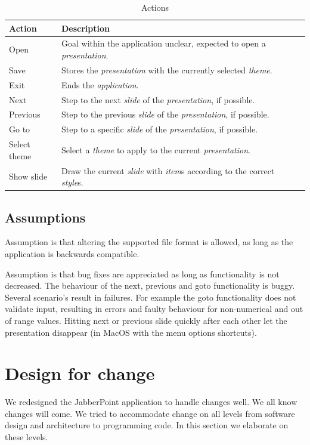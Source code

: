 \documentclass[a4paper]{article}
\begin{document}
\begin{table}[!htpb]
\centering
\begin{tabular}{|l|l|l|l|}
\hline
\textbf{Action} & \textbf{Description}\\
\hline
\hline
Open & Goal within the application unclear, expected to open a \textit{presentation}.\\
\hline
Save & Stores the \textit{presentation} with the currently selected \textit{theme}.\\ 
\hline
Exit & Ends the \textit{application}.\\
\hline
Next & Step to the next \textit{slide} of the \textit{presentation}, if possible.\\
\hline
Previous & Step to the previous \textit{slide} of the \textit{presentation}, if possible.\\
\hline
Go to & Step to a specific \textit{slide} of the \textit{presentation}, if possible.\\
\hline
Select theme & Select a \textit{theme} to apply to the current \textit{presentation}.\\
\hline
Show slide & Draw the current \textit{slide} with \textit{item}s according to the correct \textit{style}s.\\
\hline
\end{tabular}
\caption{Actions}
\label{tab:template}
\end{table}

\subsection{Assumptions}
Assumption is that altering the supported file format is allowed, as long as the application is backwards compatible.

Assumption is that bug fixes are appreciated as long as functionality is not decreased. The behaviour of the next, previous and goto functionality is buggy. Several scenario's result in failures. For example the goto functionality does not validate input, resulting in errors and faulty behaviour for non-numerical and out of range values. Hitting next or previous slide quickly after each other let the presentation disappear (in MacOS with the menu options shortcuts).   

\section{Design for change}
We redesigned the JabberPoint application to handle changes well. We all know changes will come. We tried to accommodate change on all levels from software design and architecture to programming code. In this section we elaborate on these levels.
\end{document}
